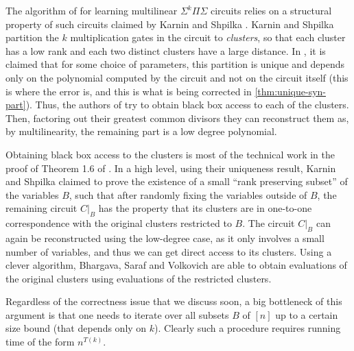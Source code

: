 \documentclass[12pt]{article}
\newcommand{\Sps}[1]{\Sigma^{#1} \Pi\Sigma}
\begin{document}
	The algorithm of \cite{BSV21} for learning multilinear $\Sps{k}$ circuits relies on a structural property of such circuits claimed by Karnin and Shpilka \cite{KarninShpilka09}. Karnin and Shpilka \cite{KarninShpilka09} partition the $k$ multiplication gates in the circuit to \emph{clusters}, so that each cluster has a low rank and each two distinct clusters have a large distance. In \cite{KarninShpilka09}, it is claimed that for some choice of parameters, this partition is unique and depends only on the polynomial computed by the circuit and not on the circuit itself (this is where the error is, and this is what is being corrected in \autoref{thm:unique-syn-part}). Thus, the authors of \cite{BSV21} try to obtain black box access to each of the clusters. Then, factoring out their greatest common divisors they can reconstruct them as, by multilinearity, the remaining part is a low degree polynomial.
	
	Obtaining black box access to the clusters is most of the technical work in the proof of Theorem 1.6 of \cite{BSV21}. In a high level, using their uniqueness result, Karnin and Shpilka \cite{KarninShpilka09} claimed to prove the existence of a small ``rank preserving subset'' of the variables $B$, such that after randomly fixing the variables outside of $B$, the remaining circuit $C|_B$ has the property that its clusters are in one-to-one correspondence with the original clusters restricted to $B$. The circuit $C|_B$ can again be reconstructed using the low-degree case, as it only involves a small number of variables, and thus we can get direct access to its clusters. Using a clever algorithm, Bhargava, Saraf and Volkovich \cite{BSV21} are able to obtain evaluations of the original clusters using evaluations of the restricted clusters.
	
	Regardless of the correctness issue that we discuss soon, a big bottleneck of this argument is that one needs to iterate over all subsets $B$ of $[n]$ up to a certain size bound (that depends only on $k$). Clearly such a procedure requires running time of the form $n^{T(k)}$. 
		
\end{document}
